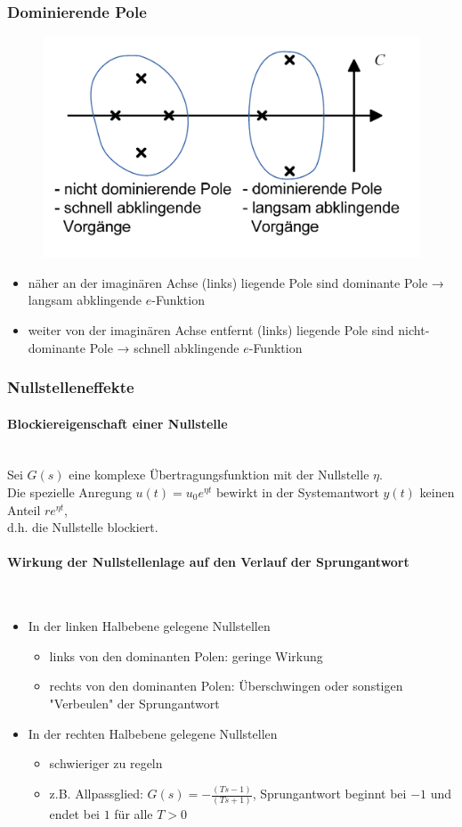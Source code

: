 \documentclass[10pt,a4paper]{article}
\begin{document}
\subsubsection{Dominierende Pole}
\begin{figure}[H]
	\includegraphics[width = 0.5\columnwidth]{imgs/pole_dominanz.png}
\end{figure}
\begin{itemize}
	\item näher an der imaginären Achse (links) liegende Pole sind dominante Pole → langsam abklingende $e$-Funktion
	\item weiter von der imaginären Achse entfernt (links) liegende Pole sind nicht-dominante Pole → schnell abklingende $e$-Funktion
\end{itemize}

\subsubsection{Nullstelleneffekte}
\paragraph{Blockiereigenschaft einer Nullstelle} ~\\
Sei $G(s)$ eine komplexe Übertragungsfunktion mit der Nullstelle $\eta$. \\
Die spezielle Anregung $u(t) = u_0 e^{\eta t}$ bewirkt in der Systemantwort $y(t)$ keinen Anteil $re^{\eta t}$, \\
d.h. die Nullstelle blockiert.

\paragraph{Wirkung der Nullstellenlage auf den Verlauf der Sprungantwort} ~\\
\begin{itemize}
	\item In der linken Halbebene gelegene Nullstellen
	\begin{itemize}
		\item links von den dominanten Polen: geringe Wirkung
		\item rechts von den dominanten Polen: Überschwingen oder sonstigen "Verbeulen" der Sprungantwort
	\end{itemize}
	\item In der rechten Halbebene gelegene Nullstellen
	\begin{itemize}
		\item schwieriger zu regeln
		\item z.B. Allpassglied: $G(s) = - \frac{(Ts - 1)}{(Ts + 1)}$, Sprungantwort beginnt bei $-1$ und endet bei $1$ für alle $T > 0$
	\end{itemize}
\end{itemize}
\end{document}

